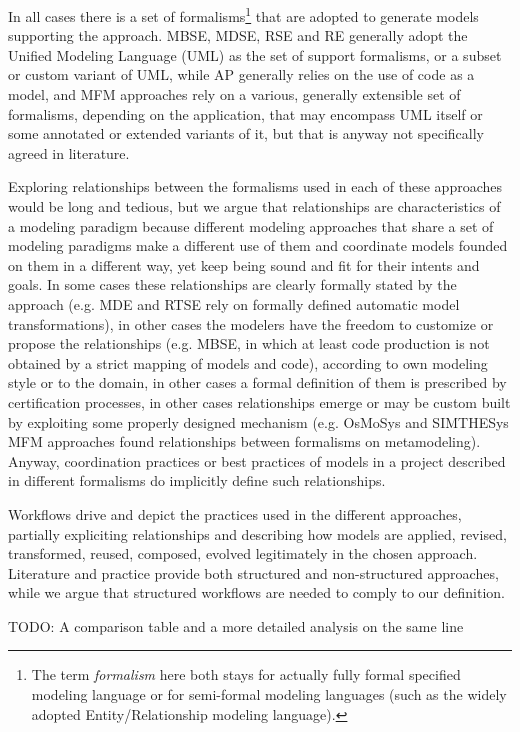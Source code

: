 In all cases there is a set of formalisms\footnote{The term \textit{formalism} here both stays for actually fully formal specified modeling language or for semi-formal modeling languages (such as the widely adopted Entity/Relationship modeling language).} that are adopted to generate models supporting the approach. MBSE, MDSE, RSE and RE generally adopt the Unified Modeling Language (UML) as the set of support formalisms, or a subset or custom variant of UML, while AP generally relies on the use of code as a model, and MFM approaches rely on a various, generally extensible set of formalisms, depending on the application, that may encompass UML itself or some annotated or extended variants of it, but that is anyway not specifically agreed in literature.

Exploring relationships between the formalisms used in each of these approaches would be long and tedious, but we argue that relationships are characteristics of a modeling paradigm because different modeling approaches that share a set of modeling paradigms make a different use of them and coordinate models founded on them in a different way, yet keep being sound and fit for their intents and goals. In some cases these relationships are clearly formally stated by the approach (e.g. MDE and RTSE rely on formally defined automatic model transformations), in other cases the modelers have the freedom to customize or propose the relationships (e.g. MBSE, in which at least code production is not obtained by a strict mapping of models and code), according to own modeling style or to the domain, in other cases a formal definition of them is prescribed by certification processes, in other cases relationships emerge or may be custom built by exploiting some properly designed mechanism (e.g. OsMoSys \cite{OsMoSys} and SIMTHESys \cite{SIMTHESys} MFM approaches found relationships between formalisms on metamodeling). Anyway, coordination practices or best practices of models in a project described in different formalisms do implicitly define such relationships.

Workflows drive and depict the practices used in the different approaches, partially expliciting relationships and describing how models are applied, revised, transformed, reused, composed, evolved legitimately in the chosen approach. Literature and practice provide both structured and non-structured approaches, while we argue that structured workflows are needed to comply to our definition.

TODO: A comparison table and a more detailed analysis on the same line

